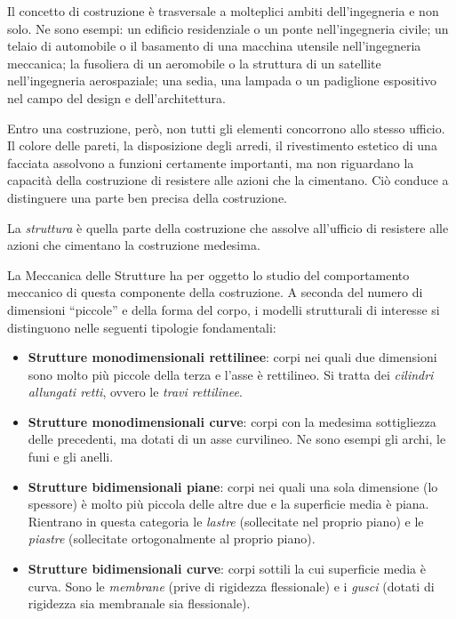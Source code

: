 Il concetto di costruzione è trasversale a molteplici ambiti dell'ingegneria e non solo. Ne sono esempi: un edificio residenziale o un ponte nell'ingegneria civile; un telaio di automobile o il basamento di una macchina utensile nell'ingegneria meccanica; la fusoliera di un
aeromobile o la struttura di un satellite nell'ingegneria aerospaziale; una sedia, una lampada o un padiglione espositivo nel campo del design e dell'architettura.

Entro una costruzione, però, non tutti gli elementi concorrono allo stesso ufficio. Il colore delle pareti, la disposizione degli arredi, il rivestimento estetico di una facciata assolvono a funzioni certamente importanti, ma non riguardano la capacità della costruzione di resistere alle azioni che la cimentano. Ciò conduce a distinguere una parte ben precisa della costruzione.

\begin{definizione}[Struttura]
	La \emph{struttura} è quella parte della costruzione	che assolve all'ufficio di resistere alle azioni che	cimentano la costruzione medesima.
\end{definizione}

La Meccanica delle Strutture ha per oggetto lo studio del comportamento meccanico di questa componente della costruzione. A seconda del numero di dimensioni ``piccole'' e della forma del corpo, i modelli strutturali di interesse si distinguono nelle seguenti
tipologie fondamentali:

\begin{itemize}[nosep]
	\item \textbf{Strutture monodimensionali rettilinee}:	corpi nei quali due dimensioni sono molto più piccole	della terza e l'asse è rettilineo. Si tratta dei	\textit{cilindri allungati retti}, ovvero le	\textit{travi rettilinee}.
	\item \textbf{Strutture monodimensionali curve}: corpi	con la medesima sottigliezza delle precedenti, ma	dotati di un asse curvilineo. Ne sono esempi gli	archi, le funi e gli anelli.
	\item \textbf{Strutture bidimensionali piane}: corpi nei quali una sola dimensione (lo spessore) è molto	più piccola delle altre due e la superficie media è	piana. Rientrano in questa categoria le	\textit{lastre} (sollecitate nel proprio piano) e	le \textit{piastre} (sollecitate ortogonalmente al	proprio piano).
	\item \textbf{Strutture bidimensionali curve}: corpi	sottili la cui superficie media è curva. Sono le	\textit{membrane} (prive di rigidezza flessionale)	e i \textit{gusci} (dotati di rigidezza sia membranale sia flessionale).
\end{itemize}



